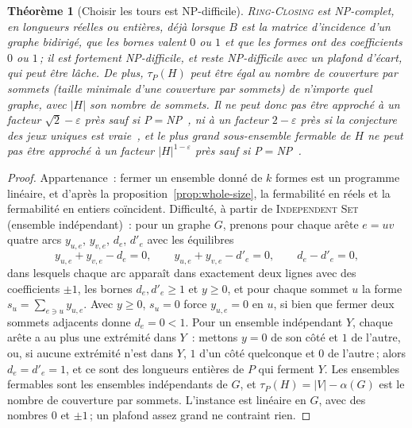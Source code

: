 \documentclass[11pt,a4paper]{article}
\newtheorem{theorem}{Théorème}
\newcommand{\shift}{s}
\newcommand{\RC}{\textup{\textsc{Ring-Closing}}}
\begin{document}
\begin{theorem}[Choisir les tours est NP-difficile]\label{thm:nphard}
\RC{} est NP-complet, en longueurs réelles ou entières, déjà lorsque $B$ est
la matrice d'incidence d'un graphe bidirigé, que les bornes valent $0$ ou $1$
et que les formes ont des coefficients $0$ ou $1$\,; il est fortement
NP-difficile, et reste NP-difficile avec un plafond d'écart, qui peut être
lâche. De plus, $\tau_P(H)$ peut être égal au nombre de couverture par
sommets (taille minimale d'une couverture par sommets) de n'importe quel
graphe, avec $|H|$ son nombre de sommets. Il ne peut donc pas être approché à
un facteur $\sqrt2 - \varepsilon$ près sauf si
P${}={}$NP~\cite{khot2017independent,dinur2018towards,dinur2018nonoptimally,khot2018grassmann},
ni à un facteur $2 - \varepsilon$ près si la conjecture des jeux uniques est
vraie~\cite{khot2008vertex}, et le plus grand sous-ensemble fermable de $H$ ne
peut pas être approché à un facteur $|H|^{1-\varepsilon}$ près sauf si
P${}={}$NP~\cite{hastad1999clique,zuckerman2007linear}.
\end{theorem}

\begin{proof}
Appartenance~: fermer un ensemble donné de $k$ formes est un programme
linéaire, et d'après la proposition~\ref{prop:whole-size}, la fermabilité en
réels et la fermabilité en entiers coïncident. Difficulté, à partir de
\textup{\textsc{Independent Set}} (ensemble indépendant)~: pour un graphe
$G$, prenons pour chaque arête $e = uv$ quatre arcs $y_{u,e}$, $y_{v,e}$,
$d_e$, $d'_e$ avec les équilibres
\[
  y_{u,e} + y_{v,e} - d_e = 0, \qquad y_{u,e} + y_{v,e} - d'_e = 0, \qquad
  d_e - d'_e = 0 ,
\]
dans lesquels chaque arc apparaît dans exactement deux lignes avec des
coefficients $\pm1$, les bornes $d_e, d'_e \ge 1$ et $y \ge 0$, et pour
chaque sommet $u$ la forme $\shift_u = \sum_{e \ni u} y_{u,e}$. Avec $y \ge
0$, $\shift_u = 0$ force $y_{u,e} = 0$ en $u$, si bien que fermer deux sommets
adjacents donne $d_e = 0 < 1$. Pour un ensemble indépendant $Y$, chaque arête
a au plus une extrémité dans $Y$~: mettons $y = 0$ de son côté et $1$ de
l'autre, ou, si aucune extrémité n'est dans $Y$, $1$ d'un côté quelconque et
$0$ de l'autre\,; alors $d_e = d'_e = 1$, et ce sont des longueurs entières de
$P$ qui ferment $Y$. Les ensembles fermables sont les ensembles indépendants
de $G$, et $\tau_P(H) = |V| - \alpha(G)$ est le nombre de couverture par
sommets. L'instance est linéaire en $G$, avec des nombres $0$ et $\pm1$\,; un
plafond assez grand ne contraint rien.
\end{proof}
\end{document}
